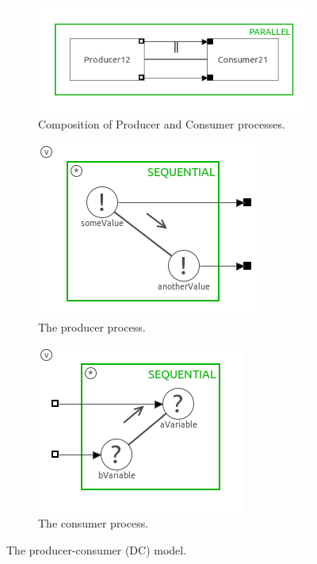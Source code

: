 \documentclass[a4paper,twoside,11pt]{article}
\begin{document}
\begin{figure}
 \centering
 \begin{subfigure}{\textwidth}
  \centering
  \includegraphics[scale=0.8]{./images/1_1-SystemDC_main.png}
  \caption{Composition of Producer and Consumer processes.}
 \end{subfigure}
 \begin{subfigure}{0.5\textwidth}
  \centering
	\includegraphics[scale=0.8]{./images/1_1-SystemDC_prod.png}
	\caption{The producer process.}
 \end{subfigure}%
 \begin{subfigure}{0.5\textwidth}
  \centering
	\includegraphics[scale=0.8]{./images/1_1-SystemDC_cons.png}
	\caption{The consumer process.}
 \end{subfigure}
  \caption{The producer-consumer (DC) model.}
  \label{fig:SystemDC}
\end{figure}
\end{document}
